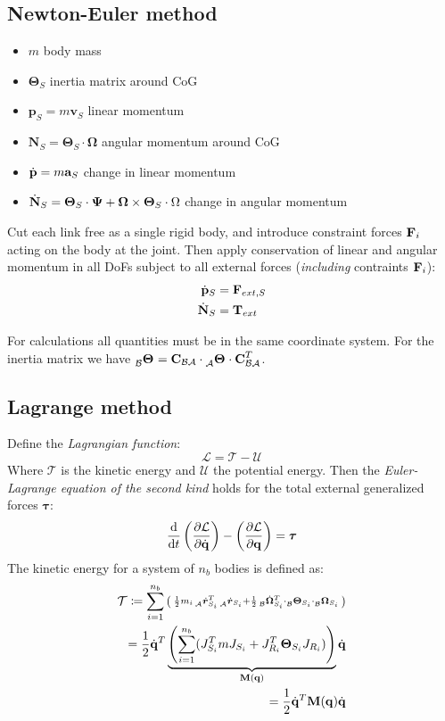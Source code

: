\documentclass[a4paper, 8pt]{extarticle}
\newcommand{\mvec}[3]{  \prescript{}{\mathcal{#1}}{\bm{#2}}  _{#3} }
\newcommand{\mdvec}[3]{ \prescript{}{\mathcal{#1}}{\dot{\bm #2}} _{#3} }
\newcommand{\mrot}[2]{ \textbf{#1}_{ \mathcal{#2} } }
\begin{document}
\begin{multicols*}{3}
\subsection{Newton-Euler method}
\begin{itemize}
\item $m$ body mass
\item $\bm\Theta_S$ inertia matrix around CoG
\item $\mathbf p_S = m \mathbf v_S$ linear momentum
\item $\mathbf N_S = \bm\Theta_S\cdot \bm\Omega$ angular momentum around CoG
\item $\dot{\bf p} = m {\bf a}_S$ change in linear momentum
\item $\dot{\bf N}_S = \bm\Theta_S \cdot \bm\Psi + \bm\Omega \times \bm\Theta_S \cdot \Omega$ change in angular momentum
\end{itemize}
\vspace{0.5em}
\noindent Cut each link free as a single rigid body, and introduce constraint forces ${\bf F}_i$ acting on the body at the joint. Then apply conservation of linear and angular momentum in all DoFs subject to all external forces (\textit{including} contraints ${\bf F}_i$):
\begin{align*}
\dot{\bf p}_S &= {\bf F}_{ext,S}\\
\dot{\bf N}_S &= {\bf T}_{ext}
\end{align*}

For calculations all quantities must be in the same coordinate system. For the inertia matrix we have $\mvec{B}{\Theta}{} = \mrot{C}{BA} \cdot \mvec{A}{\Theta}{} \cdot \mrot{C}{BA}^T$.



\subsection{Lagrange method}
Define the \emph{Lagrangian function}:
$$\mathcal L = \mathcal T - \mathcal U$$
Where $\mathcal T$ is the kinetic energy and $\mathcal U$ the potential energy. Then the \emph{Euler-Lagrange equation of the second kind} holds for the total external generalized forces $\bm\tau$:
$$\frac{\text d}{\text dt} \left( \frac{\partial\mathcal L}{\partial \dot{\bf q}} \right) - \left( \frac{\partial\mathcal L}{\partial \bf q} \right) = \bm\tau$$
The kinetic energy for a system of $n_b$ bodies is defined as:
\begin{align*}
\mathcal T \coloneqq \sum_{i=1}^{n_b}\left(\begin{smallmatrix} \frac 12 m_i \mdvec{A}{r}{S_i}^T \mdvec{A}{r}{S_i} + \frac 12 \mdvec{B}{\Omega}{S_i}^T \cdot \mvec{B}{\Theta}{S_i} \cdot \mvec{B}{\Omega}{S_i} \end{smallmatrix} \right) \\
= \frac 12 \dot{\bf q}^T \underbrace{ \left(  \sum_{i=1}^{n_b} (J^T_{S_i}mJ_{S_i} + J^T_{R_i} \bm\Theta_{S_i} J_{R_i})  \right) }_{\bf M(q)} \dot{\bf q} \\
= \frac 12 \dot{\bf q}^T {\bf M(q)} \dot{\bf q}
\end{align*}


\end{multicols*}
\end{document}

